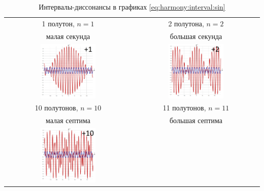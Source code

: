 \begin{table}[!ht]
    \caption{Интервалы-диссонансы в графиках \eqref{eq:harmony:interval:sin}}
    \label{t:harmony:interval:disso-1-2-10-11}
    \centering
    \begin{tabular}{c|c}
        \hline\hline
        1 полутон, $n=1$        & 2 полутона, $n=2$ \\
        малая секунда           & большая секунда \\
        \includegraphics[width=0.45\textwidth]{fig/intervals/i01}
            & \includegraphics[width=0.45\textwidth]{fig/intervals/i02} \\
        \hline\hline
        10 полутонов, $n=10$    & 11 полутонов, $n=11$ \\
        малая септима           & большая септима \\
        \includegraphics[width=0.45\textwidth]{fig/intervals/i10}

\end{tabular}
\end{table}
